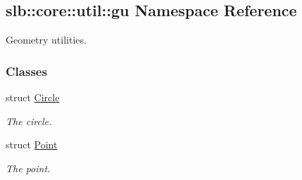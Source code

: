 \hypertarget{namespaceslb_1_1core_1_1util_1_1gu}{}\subsection{slb\+:\+:core\+:\+:util\+:\+:gu Namespace Reference}
\label{namespaceslb_1_1core_1_1util_1_1gu}


Geometry utilities.  


\subsubsection*{Classes}
\begin{DoxyCompactItemize}
\item 
struct \hyperlink{structslb_1_1core_1_1util_1_1gu_1_1Circle}{Circle}
\begin{DoxyCompactList}\small\item\em The circle. \end{DoxyCompactList}\item 
struct \hyperlink{structslb_1_1core_1_1util_1_1gu_1_1Point}{Point}
\begin{DoxyCompactList}\small\item\em The point. \end{DoxyCompactList}\end{DoxyCompactItemize}
